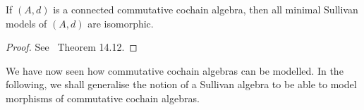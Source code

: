 \begin{Theorem}
\label{thm:UniquenessOfModels}
 If $(A,d)$ is a connected commutative cochain algebra, then all minimal Sullivan models of $(A,d)$ are isomorphic.
\end{Theorem}
\begin{proof}
 See~\cite{Felix2001} Theorem 14.12.
\end{proof}


% 
% 
% 


We have now seen how commutative cochain algebras can be modelled. In the following, we shall generalise the notion of
a Sullivan algebra to be able to model morphisms of commutative cochain algebras.

